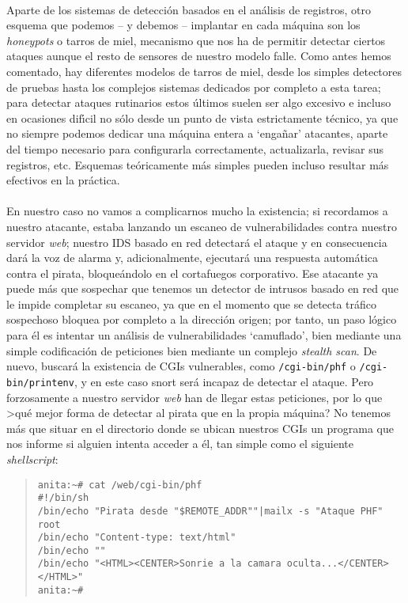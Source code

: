 \\Aparte de los sistemas de detecci\'on basados en el an\'alisis de registros, 
otro esquema que podemos -- y debemos -- implantar en cada m\'aquina son los
{\it honeypots} o tarros de miel, mecanismo que nos ha de permitir detectar
ciertos ataques aunque el resto de sensores de nuestro modelo falle. Como antes
hemos comentado, hay diferentes modelos de tarros de miel, desde los simples
detectores de pruebas hasta los complejos sistemas dedicados por completo a esta
tarea; para detectar ataques rutinarios estos \'ultimos suelen ser algo 
excesivo e incluso en ocasiones dif\'{\i}cil no s\'olo desde un punto de vista
estrictamente t\'ecnico, ya que no siempre podemos dedicar
una m\'aquina entera a `enga\~nar' atacantes, aparte del tiempo necesario para
configurarla correctamente, actualizarla, revisar sus registros, etc. Esquemas
te\'oricamente m\'as simples pueden incluso resultar m\'as efectivos en la
pr\'actica.\\
\\En nuestro caso no vamos a complicarnos mucho la existencia; si recordamos
a nuestro atacante, estaba lanzando un escaneo de vulnerabilidades contra 
nuestro servidor {\it web}; nuestro IDS basado en red detectar\'a el ataque y
en consecuencia dar\'a la voz de alarma y, adicionalmente, ejecutar\'a una
respuesta autom\'atica contra el pirata, bloque\'andolo en el cortafuegos 
corporativo. Ese atacante ya puede m\'as que sospechar que tenemos un detector
de intrusos basado en red que le impide completar su escaneo, ya que en el 
momento que se detecta tr\'afico sospechoso bloquea por completo a la 
direcci\'on origen; por tanto, un paso l\'ogico para \'el es intentar un 
an\'alisis de vulnerabilidades `camuflado', bien mediante una simple 
codificaci\'on de peticiones bien mediante un complejo {\it stealth scan}. De
nuevo, buscar\'a la existencia de CGIs vulnerables, como {\tt /cgi-bin/phf} o 
{\tt /cgi-bin/printenv}, y en este caso {\sc snort} ser\'a incapaz de detectar
el ataque. Pero forzosamente a nuestro servidor {\it web} han de llegar estas
peticiones, por lo que >qu\'e mejor forma de detectar al pirata que en la 
propia m\'aquina? No tenemos m\'as que situar en el directorio donde se ubican
nuestros CGIs un programa que nos informe si alguien intenta acceder a \'el, 
tan simple como el siguiente {\it shellscript}:
\begin{quote}
\begin{verbatim}
anita:~# cat /web/cgi-bin/phf
#!/bin/sh
/bin/echo "Pirata desde "$REMOTE_ADDR""|mailx -s "Ataque PHF" root 
/bin/echo "Content-type: text/html"
/bin/echo ""
/bin/echo "<HTML><CENTER>Sonrie a la camara oculta...</CENTER></HTML>"
anita:~# 
\end{verbatim}
\end{quote}
